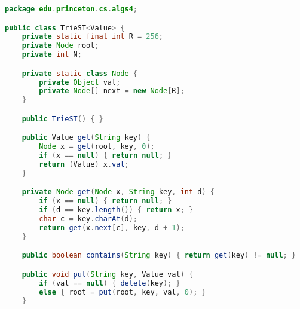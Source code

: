 \documentclass[8pt,a4paper,compress]{beamer}
\begin{document}
\begin{frame}[fragile]
\pause

Trie representation ($R = 26$)

\begin{center}
}
\end{center}
\end{frame}

\begin{frame}[fragile]
\pause

\begin{lstlisting}[language=Java]
package edu.princeton.cs.algs4;

public class TrieST<Value> {
    private static final int R = 256;
    private Node root; 
    private int N; 

    private static class Node {
        private Object val;
        private Node[] next = new Node[R];
    }

    public TrieST() { }

    public Value get(String key) {
        Node x = get(root, key, 0);
        if (x == null) { return null; }
        return (Value) x.val;
    }

    private Node get(Node x, String key, int d) {
        if (x == null) { return null; }
        if (d == key.length()) { return x; }
        char c = key.charAt(d);
        return get(x.next[c], key, d + 1);
    }

    public boolean contains(String key) { return get(key) != null; }

    public void put(String key, Value val) {
        if (val == null) { delete(key); }
        else { root = put(root, key, val, 0); }
    }
\end{lstlisting}
\end{frame}
\end{document}
